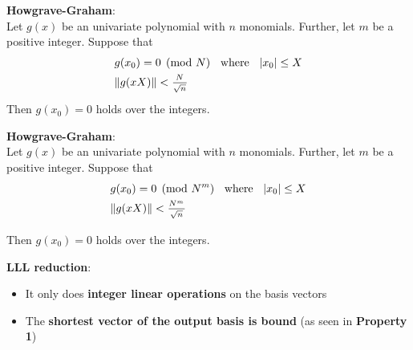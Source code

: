 \documentclass{beamer}
\begin{document}
\begin{frame}
\textbf{Howgrave-Graham}: \\
Let $g(x)$ be an univariate polynomial with $n$ monomials. Further, let $m$ be a positive integer. Suppose that
\setcounter{equation}{0}
\begin{align}
&g(x_0) = 0 \pmod{N} \hspace{2mm} \text{ where } \hspace{2mm} |x_0| \leq X\\
&\|g(xX)\| < \frac{_{N}}{^{\sqrt{n}}}
\end{align}
\pause
Then $g(x_0)=0$ holds over the integers.
\end{frame}


\begin{frame}
\textbf{Howgrave-Graham}: \\
Let $g(x)$ be an univariate polynomial with $n$ monomials. Further, let $m$ be a positive integer. Suppose that
\setcounter{equation}{0}
\begin{align}
&g(x_0) = 0 \pmod{N^m} \hspace{2mm} \text{ where } \hspace{2mm} |x_0| \leq X\\
&\|g(xX)\| < \frac{_{N^m}}{^{\sqrt{n}}}
\end{align}

Then $g(x_0)=0$ holds over the integers.
\end{frame}

\fontsize{16pt}{15.2}\selectfont
\begin{frame}
\end{frame}

%
\fontsize{14pt}{15.2}\selectfont
\begin{frame}

\textbf{LLL reduction}:
\begin{itemize}
	\item{It only does \textbf{integer linear operations} on the basis vectors}
	\item{The \textbf{shortest vector of the output basis is bound} (as seen in \textbf{Property 1})}\\
\end{itemize}
\end{frame}
\end{document}
